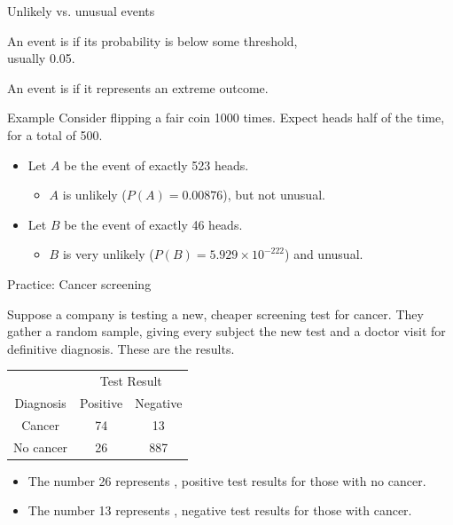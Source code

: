 \documentclass[xcolor=table, handout]{beamer}
\begin{document}
\begin{frame}{Unlikely vs. unusual events}
\begin{block}{}
\large An event is  if its probability is below some threshold,\\ usually 0.05.
\end{block}

\begin{block}{}
\large An event is  if it represents an extreme outcome.
\end{block}

\pause

\begin{exampleblock}{Example}
Consider flipping a fair coin 1000 times. Expect heads half of the time, for a total of 500.

\begin{itemize}
\pause
\item Let $A$ be the event of exactly 523 heads.
\begin{itemize}
\pause
\item $A$ is unlikely ($P(A) = 0.00876$), but not unusual.
\end{itemize}

\pause
\item  Let $B$ be the event of exactly 46 heads.
\begin{itemize}
\pause
\item $B$ is very unlikely ($P(B) = 5.929 \times 10^{-222}$) and unusual.
\end{itemize}
\end{itemize}
\end{exampleblock}
\end{frame}

\begin{frame}{Practice: Cancer screening}
\begin{block}{}
Suppose a company is testing a new, cheaper screening test for cancer. They gather a random sample, giving every subject the new test and a doctor visit for definitive diagnosis. These are the results.\\
\medskip
{\centering
\begin{tabular}{c | c  c}
\multicolumn{1}{c}{} & \multicolumn{2}{c}{Test Result}\\
Diagnosis & Positive & Negative\\
\hline
Cancer & 74 & 13\\
No cancer & 26 & 887 \\
\end{tabular}\par
}
\smallskip
\begin{itemize}
\pause
\item The number 26 represents , positive test results for those with no cancer.
\pause
\item The number 13 represents , negative test results for those with cancer.
\end{itemize}
\end{block}
\end{frame}
\end{document}
